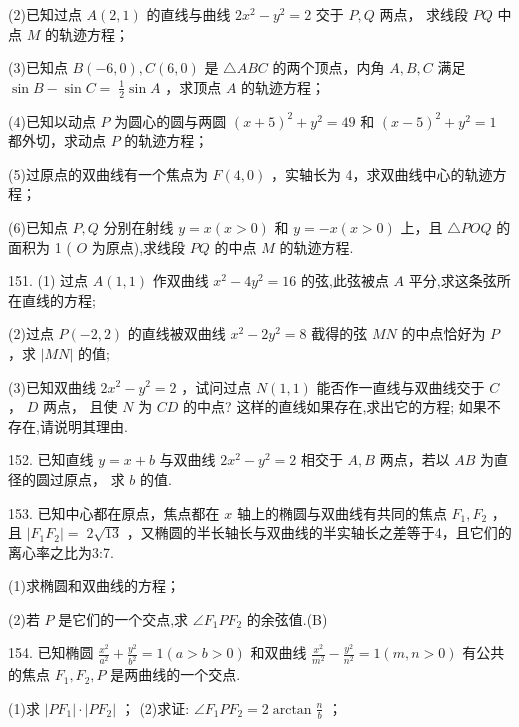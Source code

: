 \documentclass[10pt]{article}
\begin{document}
(2)已知过点 \(A\left( {2,1}\right)\) 的直线与曲线 \(2{x}^{2} - {y}^{2} = 2\) 交于 \(P,Q\) 两点， 求线段 \({PQ}\) 中点 \(M\) 的轨迹方程；

(3)已知点 \(B\left( {-6,0}\right) ,C\left( {6,0}\right)\) 是 \(\bigtriangleup  {ABC}\) 的两个顶点，内角 \(A,B,C\) 满足 \(\sin B - \sin C = \; \frac{1}{2}\sin A\) ，求顶点 \(A\) 的轨迹方程；

(4)已知以动点 \(P\) 为圆心的圆与两圆 \({\left( x + 5\right) }^{2} + {y}^{2} = {49}\) 和 \({\left( x - 5\right) }^{2} + {y}^{2} = 1\) 都外切，求动点 \(P\) 的轨迹方程；

(5)过原点的双曲线有一个焦点为 \(F\left( {4,0}\right)\) ，实轴长为 4，求双曲线中心的轨迹方程；

(6)已知点 \(P,Q\) 分别在射线 \(y = x\left( {x > 0}\right)\) 和 \(y =  - x\left( {x > 0}\right)\) 上，且 \(\bigtriangleup  {POQ}\) 的面积为 1 ( \(O\) 为原点),求线段 \({PQ}\) 的中点 \(M\) 的轨迹方程.

151. (1) 过点 \(A\left( {1,1}\right)\) 作双曲线 \({x}^{2} - 4{y}^{2} = {16}\) 的弦,此弦被点 \(A\) 平分,求这条弦所在直线的方程;

(2)过点 \(P\left( {-2,2}\right)\) 的直线被双曲线 \({x}^{2} - 2{y}^{2} = 8\) 截得的弦 \({MN}\) 的中点恰好为 \(P\) ，求 \(\left| {MN}\right|\) 的值;

(3)已知双曲线 \(2{x}^{2} - {y}^{2} = 2\) ，试问过点 \(N\left( {1,1}\right)\) 能否作一直线与双曲线交于 \(C\) ， \(D\) 两点， 且使 \(N\) 为 \({CD}\) 的中点? 这样的直线如果存在,求出它的方程; 如果不存在,请说明其理由.

152. 已知直线 \(y = x + b\) 与双曲线 \(2{x}^{2} - {y}^{2} = 2\) 相交于 \(A,B\) 两点，若以 \({AB}\) 为直径的圆过原点， 求 \(b\) 的值.

153. 已知中心都在原点，焦点都在 \(x\) 轴上的椭圆与双曲线有共同的焦点 \({F}_{1},{F}_{2}\) ，且 \(\left| {{F}_{1}{F}_{2}}\right|  = \; 2\sqrt{13}\) ，又椭圆的半长轴长与双曲线的半实轴长之差等于4，且它们的离心率之比为3:7.

(1)求椭圆和双曲线的方程；

(2)若 \(P\) 是它们的一个交点,求 \(\angle {F}_{1}P{F}_{2}\) 的余弦值.(B)

154. 已知椭圆 \(\frac{{x}^{2}}{{a}^{2}} + \frac{{y}^{2}}{{b}^{2}} = 1\left( {a > b > 0}\right)\) 和双曲线 \(\frac{{x}^{2}}{{m}^{2}} - \frac{{y}^{2}}{{n}^{2}} = 1\left( {m,n > 0}\right)\) 有公共的焦点 \({F}_{1},{F}_{2},P\) 是两曲线的一个交点.

(1)求 \(\left| {P{F}_{1}}\right|  \cdot  \left| {P{F}_{2}}\right|\) ； (2)求证: \(\angle {F}_{1}P{F}_{2} = {2\arctan \frac{n}{b}}\) ；
\end{document}
